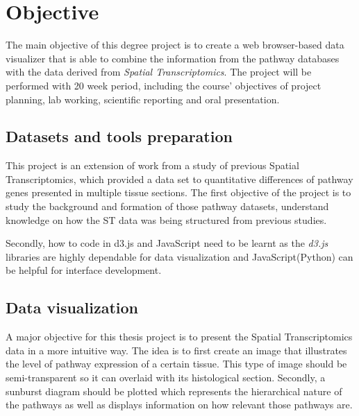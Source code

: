 \documentclass[a4paper]{article}
\begin{document}

\makeititle



\section{Objective}
The main objective of this degree project is to create a web browser-based data visualizer that is able to combine the information from the pathway databases with the data derived from \textit{Spatial Transcriptomics}. The project will be performed with 20 week period, including the course' objectives of project planning, lab working, scientific reporting and oral presentation.

\subsection{Datasets and tools preparation}
This project is an extension of work from a study of previous Spatial Transcriptomics, which provided a data set to quantitative differences of pathway genes presented in multiple tissue sections. The first objective of the project is to study the background and formation of those pathway datasets, understand knowledge on how the ST data was being structured from previous studies.

Secondly, how to code in d3.js and JavaScript need to be learnt as the \textit{d3.js} libraries are highly dependable for data visualization and JavaScript(Python) can be helpful for interface development.


\subsection{Data visualization}
A major objective for this thesis project is to present the Spatial Transcriptomics data in a more intuitive way. The idea is to first create an image that illustrates the level of pathway expression of a certain tissue. This type of image should be semi-transparent so it can overlaid with its histological section. Secondly, a sunburst diagram should be plotted which represents the hierarchical nature of the pathways as well as displays information on how relevant those pathways are. 
\end{document}
